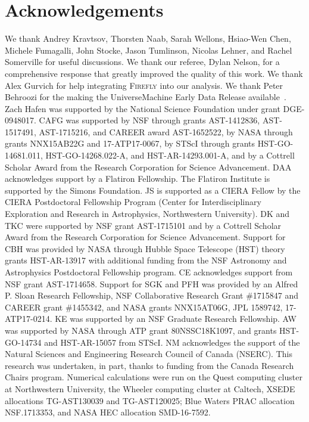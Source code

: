 \documentclass[fleqn,usenatbib]{mnras}
\begin{document}
\section*{Acknowledgements}

We thank
Andrey Kravtsov,
Thorsten Naab,
Sarah Wellons,
Hsiao-Wen Chen,
Michele Fumagalli,
John Stocke,
Jason Tumlinson,
Nicolas Lehner,
and
Rachel Somerville
for useful discussions.
We thank our referee, Dylan Nelson, for a comprehensive response that greatly improved the quality of this work.
We thank Alex Gurvich for help integrating \textsc{Firefly} into our analysis.
We thank Peter Behroozi for the making the UniverseMachine Early Data Release available~\citep{Behroozi2018}.
Zach Hafen was supported by the National Science Foundation under grant DGE-0948017.
CAFG was supported by NSF through grants AST-1412836, AST-1517491, AST-1715216, and CAREER award AST-1652522, by NASA through grants NNX15AB22G and 17-ATP17-0067, by STScI through grants HST-GO-14681.011, HST-GO-14268.022-A, and HST-AR-14293.001-A, and by a Cottrell Scholar Award from the Research Corporation for Science Advancement.
DAA acknowledges support by a Flatiron Fellowship.
The Flatiron Institute is supported by the Simons Foundation.
JS is supported as a CIERA Fellow by the CIERA Postdoctoral Fellowship Program (Center for Interdisciplinary Exploration and Research in Astrophysics, Northwestern University).
DK and TKC were supported by NSF grant AST-1715101 and by a Cottrell Scholar Award from the Research Corporation for Science Advancement.
Support for CBH was provided by NASA through Hubble Space Telescope (HST) theory grants HST-AR-13917 with additional funding from the NSF Astronomy and Astrophysics Postdoctoral Fellowship program.
CE acknowledges support from NSF grant AST-1714658.
Support for SGK and PFH was provided by an Alfred P. Sloan Research Fellowship, NSF Collaborative Research Grant \#1715847 and CAREER grant \#1455342, and NASA grants NNX15AT06G, JPL 1589742, 17-ATP17-0214.
KE was supported by an NSF Graduate Research Fellowship.
AW was supported by NASA through ATP grant 80NSSC18K1097, and grants HST-GO-14734 and HST-AR-15057 from STScI. 
NM acknowledges the support of the Natural Sciences and Engineering Research Council of Canada (NSERC).
This research was undertaken, in part, thanks to funding from the Canada Research Chairs program.
Numerical calculations were run on
the Quest computing cluster at Northwestern University, 
the Wheeler computing cluster at Caltech, 
XSEDE allocations TG-AST130039 and TG-AST120025;
Blue Waters PRAC allocation NSF.1713353, 
and NASA HEC allocation SMD-16-7592.
\end{document}
